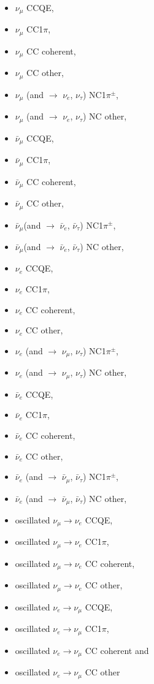\begin{itemize}
\item $\nu_{\mu}$ CCQE,
\item $\nu_{\mu}$ CC1$\pi$,
\item $\nu_{\mu}$ CC coherent,
\item $\nu_{\mu}$ CC other,
\item $\nu_{\mu}$ (and $\rightarrow$ $\nu_{e}$, $\nu_{\tau}$) NC1$\pi^{\pm}$,
\item $\nu_{\mu}$ (and $\rightarrow$ $\nu_{e}$, $\nu_{\tau}$) NC other,
\item $\bar{\nu}_{\mu}$ CCQE,
\item $\bar{\nu}_{\mu}$ CC1$\pi$,
\item $\bar{\nu}_{\mu}$ CC coherent,
\item $\bar{\nu}_{\mu}$ CC other,
\item $\bar{\nu}_{\mu}$(and $\rightarrow$ $\bar{\nu}_{e}$, $\bar{\nu}_{\tau}$) NC1$\pi^{\pm}$,
\item $\bar{\nu}_{\mu}$(and $\rightarrow$ $\bar{\nu}_{e}$, $\bar{\nu}_{\tau}$) NC other,
\item $\nu_{e}$ CCQE,
\item $\nu_{e}$ CC1$\pi$,
\item $\nu_{e}$ CC coherent,
\item $\nu_{e}$ CC other,
\item $\nu_{e}$ (and $\rightarrow$ $\nu_{\mu}$, $\nu_{\tau}$) NC1$\pi^{\pm}$,
\item $\nu_{e}$ (and $\rightarrow$ $\nu_{\mu}$, $\nu_{\tau}$) NC other,
\item $\bar{\nu}_{e}$ CCQE,
\item $\bar{\nu}_{e}$ CC1$\pi$,
\item $\bar{\nu}_{e}$ CC coherent,
\item $\bar{\nu}_{e}$ CC other,
\item $\bar{\nu}_{e}$ (and $\rightarrow$ $\bar{\nu}_{\mu}$, $\bar{\nu}_{\tau}$) NC1$\pi^{\pm}$,
\item $\bar{\nu}_{e}$ (and $\rightarrow$ $\bar{\nu}_{\mu}$, $\bar{\nu}_{\tau}$) NC other,
\item oscillated $\nu_{\mu} \rightarrow \nu_{e}$ CCQE,
\item oscillated $\nu_{\mu} \rightarrow \nu_{e}$ CC1$\pi$,
\item oscillated $\nu_{\mu} \rightarrow \nu_{e}$ CC coherent,
\item oscillated $\nu_{\mu} \rightarrow \nu_{e}$ CC other,
\item oscillated $\nu_{e} \rightarrow \nu_{\mu}$ CCQE,
\item oscillated $\nu_{e} \rightarrow \nu_{\mu}$ CC1$\pi$,
\item oscillated $\nu_{e} \rightarrow \nu_{\mu}$ CC coherent and
\item oscillated $\nu_{e} \rightarrow \nu_{\mu}$ CC other
\end{itemize}
